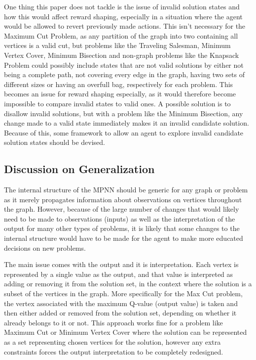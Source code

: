\documentclass{article}
\begin{document}
One thing this paper does not tackle is the issue of invalid solution states and how this would affect reward shaping, especially in a situation where the agent would be allowed to revert previously made actions. This isn't necessary for the Maximum Cut Problem, as any partition of the graph into two containing all vertices is a valid cut, but problems like the Traveling Salesman, Minimum Vertex Cover, Minimum Bisection and non-graph problems like the Knapsack Problem could possibly include states that are not valid solutions by either not being a complete path, not covering every edge in the graph, having two sets of different sizes or having an overfull bag, respectively for each problem. This becomes an issue for reward shaping especially, as it would therefore become impossible to compare invalid states to valid ones. A possible solution is to disallow invalid solutions, but with a problem like the Minimum Bisection, any change made to a valid state immediately makes it an invalid candidate solution. Because of this, some framework to allow an agent to explore invalid candidate solution states should be devised. 

\subsection{Discussion on Generalization}

The internal structure of the MPNN should be generic for any graph or problem as it merely propagates information about observations on vertices throughout the graph. However, because of the large number of changes that would likely need to be made to observations (inputs) as well as the interpretation of the output for many other types of problems, it is likely that some changes to the internal structure would have to be made for the agent to make more educated decisions on new problems. 

The main issue comes with the output and it is interpretation. Each vertex is represented by a single value as the output, and that value is interpreted as adding or removing it from the solution set, in the context where the solution is a subset of the vertices in the graph. More specifically for the Max Cut problem, the vertex associated with the maximum Q-value (output value) is taken and then either added or removed from the solution set, depending on whether it already belongs to it or not. This approach works fine for a problem like Maximum Cut or Minimum Vertex Cover where the solution can be represented as a set representing chosen vertices for the solution, however any extra constraints forces the output interpretation to be completely redesigned. 
\end{document}

